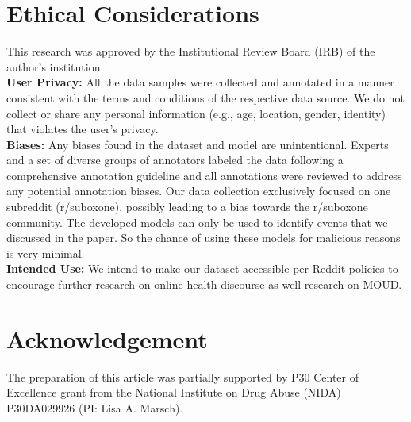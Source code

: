 \documentclass[letterpaper]{article} %
\begin{document}
\section{Ethical Considerations}
This research was approved by the Institutional Review Board (IRB) of the author's institution.
\\
\textbf{User Privacy:} All the data samples were collected and annotated in a manner consistent with the terms and conditions of the respective data source. We do not collect or share any personal information (e.g., age, location, gender, identity) that violates the user's privacy. 
\\
\textbf{Biases:} Any biases found in the dataset and model are unintentional. Experts and a set of diverse groups of annotators labeled the data following a comprehensive annotation guideline and all annotations were reviewed to address any potential annotation biases. Our data collection exclusively focused on one subreddit (r/suboxone), possibly leading to a bias towards the r/suboxone community. The developed models can only be used to identify events that we
discussed in the paper. So the chance of using these models
for malicious reasons is very minimal.
\\
\textbf{Intended Use:} We intend to make our dataset accessible per Reddit policies to encourage further research on online health discourse as well research on MOUD. 
\section{Acknowledgement}
The preparation of this article was partially supported by P30 Center of Excellence grant from the National Institute on Drug Abuse (NIDA) P30DA029926 (PI: Lisa A. Marsch).



\end{document}
